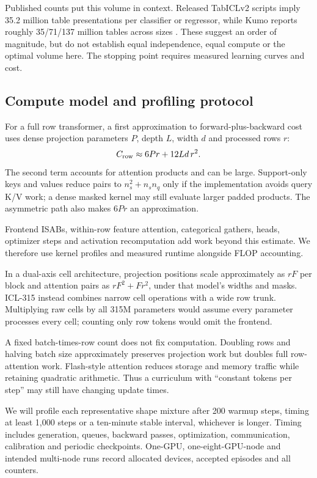 \documentclass[11pt]{article}
\begin{document}
Published counts put this volume in context. Released TabICLv2 scripts imply 35.2 million table presentations per classifier or regressor, while Kumo reports roughly 35/71/137 million tables across sizes \cite{tabicl-code,kumo}. These suggest an order of magnitude, but do not establish equal independence, equal compute or the optimal volume here. The stopping point requires measured learning curves and cost.

\subsection{Compute model and profiling protocol}

For a full row transformer, a first approximation to forward-plus-backward cost uses dense projection parameters $P$, depth $L$, width $d$ and processed rows $r$:
\begin{equation}
C_{\rm row}\approx6Pr+12Ld\,r^2.
\end{equation}
The second term accounts for attention products and can be large. Support-only keys and values reduce pairs to $n_s^2+n_sn_q$ only if the implementation avoids query K/V work; a dense masked kernel may still evaluate larger padded products. The asymmetric path also makes $6Pr$ an approximation.

Frontend ISABs, within-row feature attention, categorical gathers, heads, optimizer steps and activation recomputation add work beyond this estimate. We therefore use kernel profiles and measured runtime alongside FLOP accounting.

In a dual-axis cell architecture, projection positions scale approximately as $rF$ per block and attention pairs as $rF^2+Fr^2$, under that model's widths and masks. ICL-315 instead combines narrow cell operations with a wide row trunk. Multiplying raw cells by all 315M parameters would assume every parameter processes every cell; counting only row tokens would omit the frontend.

A fixed batch-times-row count does not fix computation. Doubling rows and halving batch size approximately preserves projection work but doubles full row-attention work. Flash-style attention reduces storage and memory traffic while retaining quadratic arithmetic. Thus a curriculum with ``constant tokens per step'' may still have changing update times.

We will profile each representative shape mixture after 200 warmup steps, timing at least 1,000 steps or a ten-minute stable interval, whichever is longer. Timing includes generation, queues, backward passes, optimization, communication, calibration and periodic checkpoints. One-GPU, one-eight-GPU-node and intended multi-node runs record allocated devices, accepted episodes and all counters.
\end{document}
